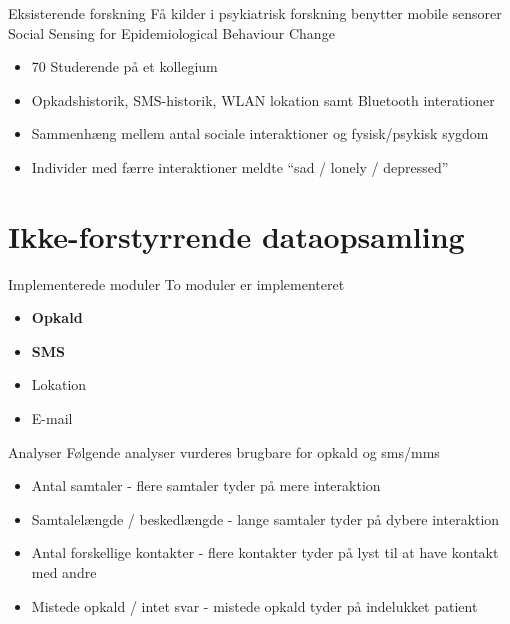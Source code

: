 { %
	\begin{frame}{Eksisterende forskning} %
		Få kilder i psykiatrisk forskning benytter mobile sensorer
		Social Sensing for Epidemiological Behaviour Change
		\begin{itemize}
			\item 70 Studerende på et kollegium
			\item Opkadshistorik, SMS-historik, WLAN lokation samt Bluetooth interationer
			\item Sammenhæng mellem antal sociale interaktioner og fysisk/psykisk sygdom
			\item Individer med færre interaktioner meldte ``sad / lonely / depressed''
		\end{itemize}
		
		
	\end{frame}}

\section{Ikke-forstyrrende dataopsamling}
{ %
	\begin{frame}{Implementerede moduler} %
		To moduler er implementeret
		\begin{itemize}
			\item \textbf{Opkald}
			\item \textbf{SMS}
			\item Lokation
			\item E-mail
		\end{itemize}
			
	\end{frame}}



{ %
\begin{frame}{Analyser} %
Følgende analyser vurderes brugbare for opkald og sms/mms
\begin{itemize}
	\item Antal samtaler - flere samtaler tyder på mere interaktion
	\item Samtalelængde / beskedlængde - lange samtaler tyder på dybere interaktion
	\item Antal forskellige kontakter - flere kontakter tyder på lyst til at have kontakt med andre
	\item Mistede opkald / intet svar - mistede opkald tyder på indelukket patient
\end{itemize}
	
\end{frame}}

